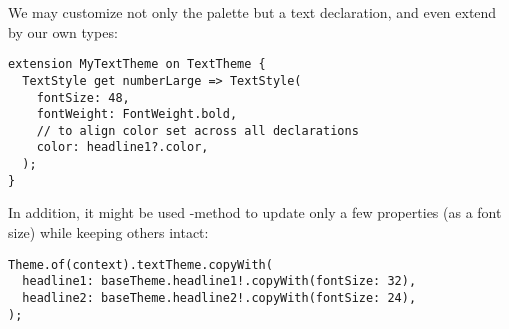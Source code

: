 We may customize not only the palette but a text declaration, and even extend  by our own types:

\begin{lstlisting}
extension MyTextTheme on TextTheme {
  TextStyle get numberLarge => TextStyle(
    fontSize: 48,
    fontWeight: FontWeight.bold,
    // to align color set across all declarations
    color: headline1?.color,
  );
}
\end{lstlisting}

\noindent In addition, it might be used -method to update only a few properties (as a font size) while 
keeping others intact: 

\begin{lstlisting}
Theme.of(context).textTheme.copyWith(
  headline1: baseTheme.headline1!.copyWith(fontSize: 32),
  headline2: baseTheme.headline2!.copyWith(fontSize: 24),
);
\end{lstlisting}

